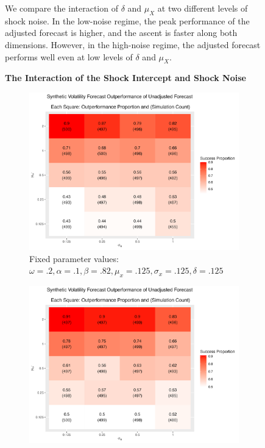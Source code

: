 \documentclass[11pt,3p,review,authoryear]{elsarticle}
\theoremstyle{definition}
\begin{document}
\begin{figure}[!h]
      \caption{We compare the interaction of $\delta$ and $\mu_{X}$ at two different levels of shock noise.  In the low-noise regime, the peak performance of the adjusted forecast is higher, and the ascent is faster along both dimensions.   However, in the high-noise regime, the adjusted forecast performs well even at low levels of $\delta$ and $\mu_{X}$.}
      \label{fig:sig_volprof}
    \end{figure}

\begin{figure}[!h]
  \centering
  \textbf{The Interaction of the Shock Intercept and Shock Noise}\par\medskip
\begin{subfigure}{.44\linewidth} 
  \centering
    \includegraphics[scale = .42]{simulation_plots/Jun06_234137_2024_mu_omega_star_sigma_u.png}
    \caption{Fixed parameter values: $\omega = .2, \alpha = .1, \beta = .82, \mu_{x} = .125, \sigma_{x} = .125, \delta = .125$}\label{fig:sim_6}
\end{subfigure}\hspace{12mm} %
\begin{subfigure}{.44\linewidth} 
  \centering
    \includegraphics[scale=.42]{simulation_plots/Jun06_234154_2024_mu_omega_star_sigma_u.png}

\end{subfigure}
\end{figure}
\end{document}
